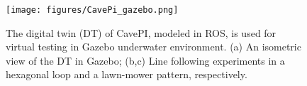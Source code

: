 \begin{table}[h]
\centering
\caption{Depth errors from the line following experiments are compared for various choices of $K_p$ and $K_d$ of the depth controller. Here, $\mu$: mean depth error (cm), $\sigma$: standard deviation.}%
\vspace{-1mm}
\label{tab:depth_controller_tuning}
\vspace{-2mm}
\end{table}


\begin{figure}[b]
    \centering
    \texttt{[image: figures/CavePi\_gazebo.png]}%
    \caption{The digital twin (DT) of CavePI, modeled in ROS, is used for virtual testing in Gazebo underwater environment. (a) An isometric view of the DT in Gazebo; (b,c) Line following experiments in a hexagonal loop and a lawn-mower pattern, respectively.
    }%
    \vspace{-4mm}
    \label{fig:gazebo}
\end{figure}

